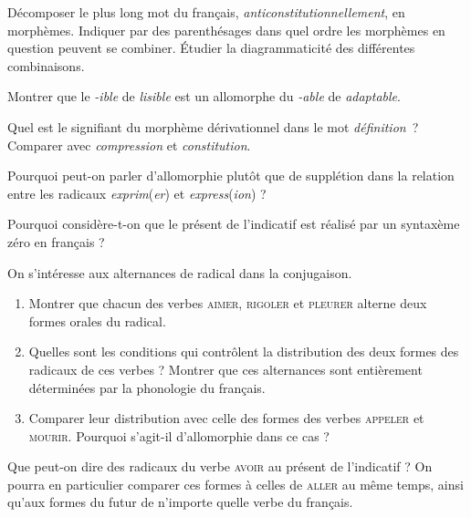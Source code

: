 {     Décomposer le plus long mot du français, \textit{anticonstitutionnellement}, en morphèmes. Indiquer par des parenthésages dans quel ordre les morphèmes en question peuvent se combiner. Étudier la diagrammaticité des différentes combinaisons.

     Montrer que le \textit{{}-ible} de \textit{lisible} est un allomorphe du \textit{{}-able} de \textit{adaptable}.

     Quel est le signifiant du morphème dérivationnel dans le mot \textit{définition~}? Comparer avec \textit{compression} et \textit{constitution}.

     Pourquoi peut-on parler d’allomorphie plutôt que de supplétion dans la relation entre les radicaux \textit{exprim}(\textit{er}) et \textit{express}(\textit{ion}) ?

     Pourquoi considère-t-on que le présent de l’indicatif est réalisé par un syntaxème zéro en français ?

     On s’intéresse aux alternances de radical dans la conjugaison.
    
    \begin{enumerate}[label=\alph*.]
    \item Montrer que chacun des verbes \textsc{aimer}, \textsc{rigoler} et \textsc{pleurer} alterne deux formes orales du radical.
    \item Quelles sont les conditions qui contrôlent la distribution des deux formes des radicaux de ces verbes ? Montrer que ces alternances sont entièrement déterminées par la phonologie du français.
    \item Comparer leur distribution avec celle des formes des verbes \textsc{appeler} et \textsc{mourir}. Pourquoi s’agit-il d’allomorphie dans ce cas ?
    \end{enumerate}
    
      Que peut-on dire des radicaux du verbe \textsc{avoir} au présent de l'indicatif ? On pourra en particulier comparer ces formes à celles de \textsc{aller} au même temps, ainsi qu'aux formes du futur de n'importe quelle verbe du français.
}
